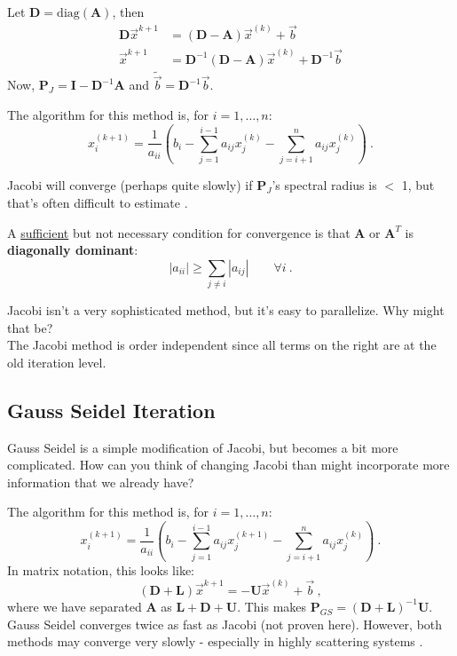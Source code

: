 \documentclass[12pt]{article}
\newcommand{\ve}[1]{\ensuremath{\mathbf{#1}}}
\begin{document}
Let $\ve{D} = \text{diag}(\ve{A})$, then
\begin{align}
\ve{D} \vec{x}^{k+1} &= (\ve{D} - \ve{A})\vec{x}^{(k)} + \vec{b} \nonumber \\
%
\vec{x}^{k+1} &= \ve{D}^{-1}(\ve{D} - \ve{A})\vec{x}^{(k)} + \ve{D}^{-1}\vec{b} \nonumber
\end{align}
%
Now, $\ve{P}_J = \ve{I} -  \ve{D}^{-1}\ve{A}$ and $\tilde{\vec{b}} =\ve{D}^{-1}\vec{b}$.

The algorithm for this method is, for $i = 1, \dots, n$:
\[ x^{(k+1)}_i = \frac{1}{a_{ii}}(b_i - \sum_{j=1}^{i-1} a_{ij} x_j^{(k)} - \sum_{j=i+1}^{n} a_{ij} x_j^{(k)})\:.\]

Jacobi will converge (perhaps quite slowly) if $\ve{P}_J$'s spectral radius is $<$ 1, but that's often difficult to estimate \cite{LeVeque2007}. 

A \underline{sufficient} but not necessary condition for convergence is that $\ve{A}$ or $\ve{A}^T$ is \textbf{diagonally dominant}:
%
\[|a_{ii}| \geq \sum_{j \neq i} |a_{ij}| \qquad \forall i \:.\]

Jacobi isn't a very sophisticated method, but it's easy to parallelize. Why might that be? \\The Jacobi method is order independent since all terms on the right are at the old iteration level. 


\subsection*{Gauss Seidel Iteration}

Gauss Seidel is a simple modification of Jacobi, but becomes a bit more complicated. How can you think of changing Jacobi than might incorporate more information that we already have?

The algorithm for this method is, for $i = 1, \dots, n$:
\[ x^{(k+1)}_i = \frac{1}{a_{ii}}(b_i - \sum_{j=1}^{i-1} a_{ij} x_j^{(k+1)} - \sum_{j=i+1}^{n} a_{ij} x_j^{(k)}) \:.\]
%
In matrix notation, this looks like:
\[(\ve{D} + \ve{L})\vec{x}^{k+1} = -\ve{U} \vec{x}^{(k)} + \vec{b}\:, \]
where we have separated $\ve{A}$ as $\ve{L} + \ve{D} + \ve{U}$. This makes $\ve{P}_{GS} = (\ve{D} + \ve{L})^{-1}\ve{U}$. Gauss Seidel %
converges twice as fast as Jacobi (not proven here). However, both methods may converge very slowly - especially in highly scattering systems \cite{LeVeque2007}. 
\end{document}
